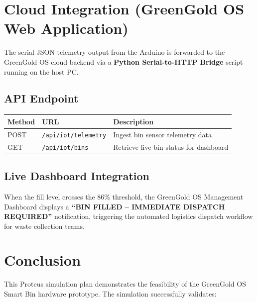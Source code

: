 \documentclass[12pt,a4paper]{article}
\begin{document}
\section{Cloud Integration (GreenGold OS Web Application)}

The serial JSON telemetry output from the Arduino is forwarded to the GreenGold OS cloud backend via a \textbf{Python Serial-to-HTTP Bridge} script running on the host PC.

\subsection{API Endpoint}

\begin{table}[H]
\centering
\begin{tabular}{@{}lll@{}}
\toprule
\textbf{Method} & \textbf{URL} & \textbf{Description} \\
\midrule
POST & \texttt{/api/iot/telemetry} & Ingest bin sensor telemetry data \\
GET  & \texttt{/api/iot/bins}      & Retrieve live bin status for dashboard \\
\bottomrule
\end{tabular}
\end{table}

\subsection{Live Dashboard Integration}

When the fill level crosses the 86\% threshold, the GreenGold OS Management Dashboard displays a \textbf{``BIN FILLED -- IMMEDIATE DISPATCH REQUIRED''} notification, triggering the automated logistics dispatch workflow for waste collection teams.

\section{Conclusion}

This Proteus simulation plan demonstrates the feasibility of the GreenGold OS Smart Bin hardware prototype. The simulation successfully validates:
\end{document}
